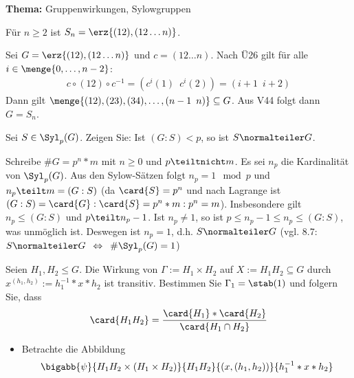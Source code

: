 \begin{uebungsblatt}

\textbf{Thema:} Gruppenwirkungen, Sylowgruppen
\vspace{0.5cm}
%
\setcounter{taskcount}{46}
%
\begin{uebung}
	Für $n \geq 2$ ist $S_n=\erz{(12),(12 \dots n)}$.
\end{uebung}
\begin{loesung}
	Sei $G = \erz{(12), (12\dots n)}$ und $c = (12 \dots n)$. Nach Ü26 gilt für alle $i \in \menge{0, \dots, n-2}$: 
	\begin{align*}
		c \circ (12) \circ c^{-1} = (c^i(1) \enspace c^i(2) ) = (i+1 \enspace i+2)
	\end{align*}
	Dann gilt $\menge{(12),(23),(34), \dots , (n-1 \enspace n)} \subseteq G$. Aus V44 folgt dann $G = S_n$.
\end{loesung}
%
\begin{uebung}
	Sei $S \in \Syl_p(G)$. Zeigen Sie: Ist $(G:S) < p$, so ist $S \normalteiler G$.
\end{uebung}
\begin{loesung}
	Schreibe $\# G = p^n * m$ mit $n \geq 0$ und $p \teiltnicht m$. Es sei $n_p$ die Kardinalität von $\Syl_p(G)$. Aus den Sylow-Sätzen folgt $n_p = 1 \mod p$ und $n_p \teilt m = (G:S)$ (da $\card{S} = p^n$ und nach Lagrange ist $(G:S) = \card{G} : \card{S} = p^n*m : p^n =m$). Insbesondere gilt $n_p \leq (G:S)$ und $p \teilt n_p -1$. Ist $n_p \neq 1$, so ist $p \leq n_p -1 \leq n_p \leq (G:S)$, was unmöglich ist. Deswegen ist $n_p = 1$, d.h. $S \normalteiler G$ (vgl. 8.7: $S \normalteiler G \enspace \Leftrightarrow \enspace \# \Syl_p(G) = 1$)
\end{loesung}
%
\begin{uebung}
	Seien $H_1, H_2 \leq G$. Die Wirkung von $\Gamma := H_1 \times H_2$ auf $X:=H_1 H_2 \subseteq G$ durch $x^{(h_1,h_2)} := h_1^{-1}*x*h_2$ ist transitiv. Bestimmen Sie $\Gamma_1 = \stab(1)$ und folgern Sie, dass
	\begin{align*}
		\card{H_1 H_2} = \frac{\card{H_1} * \card{H_2}}{\card{H_1 \cap H_2}}
	\end{align*}
\end{uebung}
\begin{loesung}
	\begin{itemize}
		\item Betrachte die Abbildung
		\begin{align*}
			\bigabb{\psi}{H_1 H_2 \times (H_1 \times H_2)}{H_1 H_2}{(x, (h_1,h_2))}{h_1^{-1}*x*h_2}
		\end{align*}

\end{itemize}
\end{loesung}
\end{uebungsblatt}
